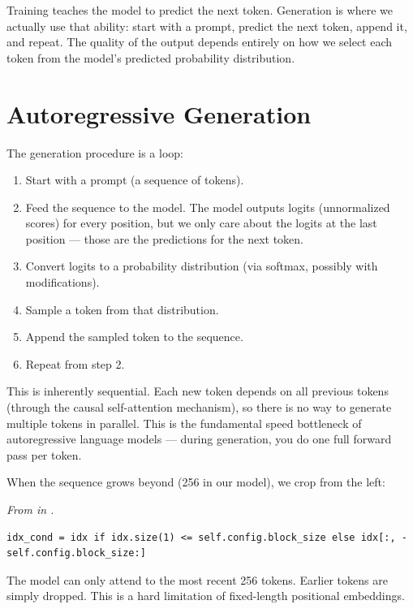 


Training teaches the model to predict the next token. Generation is where we actually use that ability: start with a prompt, predict the next token, append it, and repeat. The quality of the output depends entirely on how we select each token from the model's predicted probability distribution.

\section{Autoregressive Generation}

The generation procedure is a loop:

\begin{enumerate}
  \item Start with a prompt (a sequence of tokens).
  \item Feed the sequence to the model. The model outputs logits (unnormalized scores) for every position, but we only care about the logits at the last position --- those are the predictions for the next token.
  \item Convert logits to a probability distribution (via softmax, possibly with modifications).
  \item Sample a token from that distribution.
  \item Append the sampled token to the sequence.
  \item Repeat from step 2.
\end{enumerate}

This is inherently sequential. Each new token depends on all previous tokens (through the causal self-attention mechanism), so there is no way to generate multiple tokens in parallel. This is the fundamental speed bottleneck of autoregressive language models --- during generation, you do one full forward pass per token.

When the sequence grows beyond  (256 in our model), we crop from the left:

\concepttag
{\small\itshape From  in .}
\begin{lstlisting}
idx_cond = idx if idx.size(1) <= self.config.block_size else idx[:, -self.config.block_size:]
\end{lstlisting}

The model can only attend to the most recent 256 tokens. Earlier tokens are simply dropped. This is a hard limitation of fixed-length positional embeddings.

